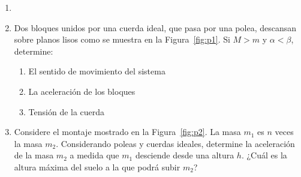 \documentclass[letterpaper,11pt]{article}
\begin{document}
\vspace{-1cm}
\begin{enumerate}\setlength{\itemsep}{0.4cm}


\item[]

\item Dos bloques unidos por una cuerda ideal, que pasa por una polea, descansan sobre planos lisos como se muestra en la Figura~\ref{fig:p1}. Si $M>m$ y $\alpha <\beta$, determine:
    \begin{enumerate}
        \item El sentido de movimiento del sistema
        
        \item La aceleración de los bloques
        
        \item Tensión de la cuerda
    \end{enumerate}

\item Considere el montaje mostrado en la Figura~\ref{fig:p2}. La masa $m_1$ es $n$ veces la masa $m_2$. Considerando poleas y cuerdas ideales, determine la aceleración de la masa $m_2$ a medida que $m_1$ desciende desde una altura $h$. ¿Cuál es la altura máxima del suelo a la que podrá subir $m_2$?


\end{enumerate}
\end{document}
